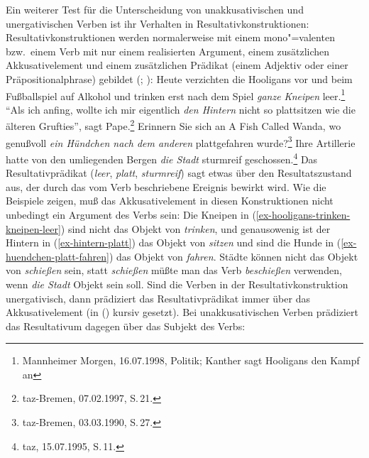 Ein weiterer Test für die Unterscheidung von unakkusativischen und unergativischen
Verben ist ihr Verhalten in Resultativkonstruktionen:
Resultativkonstruktionen werden normalerweise mit einem mono"=valenten bzw.\
einem Verb mit nur einem realisierten Argument, einem zusätzlichen Akkusativelement
und einem zusätzlichen Prädikat (einem Adjektiv oder einer Präpositionalphrase)
gebildet (\citealp{Wunderlich97c}; \citealp[Kapitel~5]{Mueller2002b}):
\eal
\ex  Heute verzichten die Hooligans vor und beim Fußballspiel auf Alkohol und trinken 
      erst nach dem Spiel \emph{ganze Kneipen} leer\iw{leer}.\label{ex-hooligans-trinken-kneipen-leer}\footnote{
        Mannheimer Morgen, 16.07.1998, Politik; Kanther sagt Hooligans den Kampf an
}
\ex\label{ex-hintern-platt} "`Als ich anfing, wollte ich mir eigentlich \emph{den Hintern} nicht so plattsitzen 
wie die älteren Grufties"', sagt Pape.\footnote{
        taz-Bremen, 07.02.1997, S.\,21.%
}
\ex Erinnern Sie sich an A Fish Called Wanda, wo genußvoll \emph{ein Hündchen nach dem anderen} plattgefahren wurde?\label{ex-huendchen-platt-fahren}\footnote{
        taz-Bremen, 03.03.1990, S.\,27.%
        }
\ex{}
Ihre Artillerie hatte von  den umliegenden Bergen    \emph{die Stadt} sturmreif  geschossen.\label{ex-hatte-die-stadt-sturmreif-geschossen}\footnote{
taz, 15.07.1995, S.\,11.%
}
\zl
Das Resultativprädikat (\emph{leer}, \emph{platt}, \emph{sturmreif}) sagt etwas über den Resultatszustand aus,
der durch das vom Verb beschriebene Ereignis bewirkt wird.
Wie die Beispiele zeigen, muß das Akkusativelement in diesen Konstruktionen nicht unbedingt
ein Argument des Verbs sein: Die Kneipen in (\ref{ex-hooligans-trinken-kneipen-leer}) 
sind nicht das Objekt von \emph{trinken}, und genausowenig ist der Hintern in (\ref{ex-hintern-platt}) das Objekt von
\emph{sitzen} und sind die Hunde in (\ref{ex-huendchen-platt-fahren}) das Objekt von \emph{fahren}. Städte können nicht das Objekt
von \emph{schießen} sein, statt \emph{schießen} müßte man das Verb \emph{beschießen} verwenden, wenn \emph{die Stadt}
Objekt sein soll. Sind die Verben in der Resultativkonstruktion unergativisch, dann prädiziert
das Resultativprädikat immer über das Akkusativelement (in (\mex{0}) kursiv gesetzt). Bei unakkusativischen Verben
prädiziert das Resultativum dagegen über das Subjekt des Verbs:
